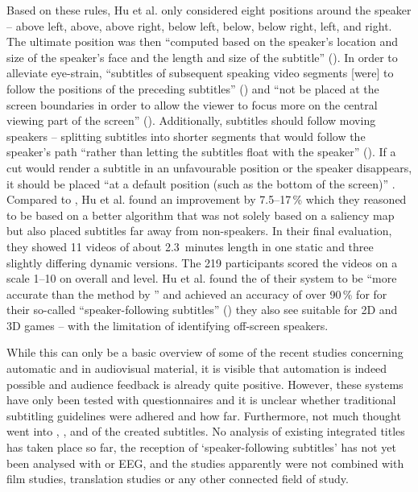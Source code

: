 Based on these rules, Hu et al. only considered eight positions around the speaker – above left, above, above right, below left, below, below right, left, and right. The ultimate position was then “computed based on the speaker’s location and size of the speaker’s face and the length and  size of the subtitle” (\citeyear{Hu2013}). In order to alleviate eye-strain, “subtitles of subsequent speaking video segments [were] to follow the positions of the preceding subtitles” (\citeyear{Hu2013}) and “not be placed at the screen boundaries in order to allow the viewer to focus more on the central viewing part of the screen” (\citeyear{Hu2013}). Additionally, subtitles should follow moving speakers – splitting subtitles into shorter segments that would follow the speaker’s path “rather than letting the subtitles float with the speaker” (\citeyear{Hu2013}). If a cut would render a subtitle in an unfavourable position or the speaker disappears, it should be placed “at a default position (such as the bottom of the screen)” \citep{Hu2013}. Compared to \citet{Hong2010}, Hu et al. found an improvement by 7.5--17\,\% which they reasoned to be based on a better  algorithm that was not solely based on a saliency map but also placed subtitles far away from non-speakers. In their final evaluation, they showed 11 videos of about 2.3~minutes length in one static and three slightly differing dynamic versions. The 219 participants scored the videos on a scale 1--10 on overall  and  level. Hu et al. found the  of their system to be “more accurate than the method by \citet{Hong2010}” \citep{Hu2013} and achieved an accuracy of over 90\,\% for  for their so-called “speaker-following subtitles” (\citeyear{Hu2013}) they also see suitable for 2D and 3D games – with the limitation of identifying off-screen speakers.

While this can only be a basic overview of some of the recent studies concerning automatic  and  in audiovisual material, it is visible that automation is indeed possible and audience feedback is already quite positive. However, these systems have only been tested with questionnaires and it is unclear whether traditional subtitling guidelines were adhered and how far. Furthermore, not much thought went into , , and  of the created subtitles. No analysis of existing integrated titles has taken place so far, the reception of ‘speaker-following subtitles’ has not yet been analysed with  or EEG, and the studies apparently were not combined with film studies, translation studies or any other connected field of study.

